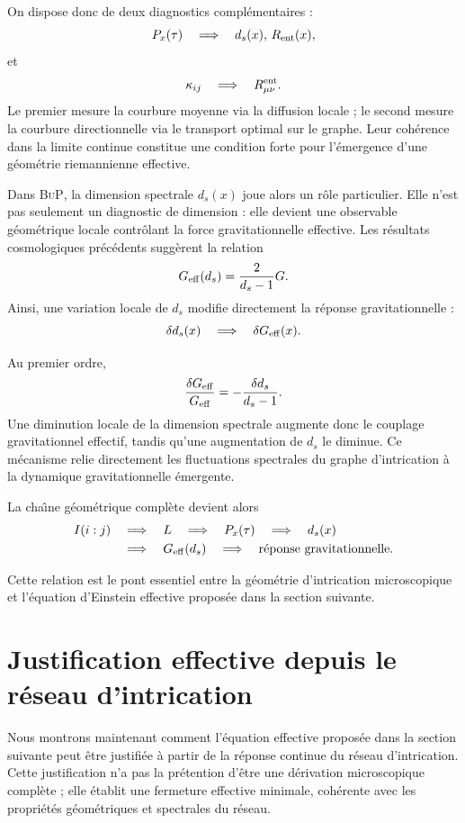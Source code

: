 \documentclass[11pt]{article}
\newcommand{\Geff}{G_{\rm eff}}
\newcommand{\BuP}{\textsc{BuP}}
\begin{document}
On dispose donc de deux diagnostics compl\'ementaires :
\[
P_x(\tau)
\quad\Longrightarrow\quad
d_s(x),\,R_{\rm ent}(x),
\]
et
\[
\kappa_{ij}
\quad\Longrightarrow\quad
R_{\mu\nu}^{\rm ent}.
\]
Le premier mesure la courbure moyenne via la diffusion locale ; le second mesure
la courbure directionnelle via le transport optimal sur le graphe. Leur coh\'erence
dans la limite continue constitue une condition forte pour l'\'emergence d'une
g\'eom\'etrie riemannienne effective.

Dans \BuP, la dimension spectrale $d_s(x)$ joue alors un r\^ole particulier. Elle
n'est pas seulement un diagnostic de dimension : elle devient une observable
g\'eom\'etrique locale contr\^olant la force gravitationnelle effective. Les r\'esultats
cosmologiques pr\'ec\'edents sugg\`erent la relation
\[
\Geff(d_s)
=
\frac{2}{d_s-1}G.
\]
Ainsi, une variation locale de $d_s$ modifie directement la r\'eponse gravitationnelle :
\[
\delta d_s(x)
\quad\Longrightarrow\quad
\delta\Geff(x).
\]

Au premier ordre,
\[
\frac{\delta\Geff}{\Geff}
=
-\frac{\delta d_s}{d_s-1}.
\]
Une diminution locale de la dimension spectrale augmente donc le couplage gravitationnel
effectif, tandis qu'une augmentation de $d_s$ le diminue. Ce m\'ecanisme relie
directement les fluctuations spectrales du graphe d'intrication \`a la dynamique
gravitationnelle \'emergente.

La cha\^{\i}ne g\'eom\'etrique compl\`ete devient alors
\[
\begin{aligned}
I(i:j)
&\quad\Longrightarrow\quad
L
\quad\Longrightarrow\quad
P_x(\tau)
\quad\Longrightarrow\quad
d_s(x)
\\
&\quad\Longrightarrow\quad
\Geff(d_s)
\quad\Longrightarrow\quad
\text{r\'eponse gravitationnelle}.
\end{aligned}
\]

Cette relation est le pont essentiel entre la g\'eom\'etrie d'intrication microscopique
et l'\'equation d'Einstein effective propos\'ee dans la section suivante.

\section{Justification effective depuis le r\'eseau d'intrication}
\label{sec:closure}

Nous montrons maintenant comment l'\'equation effective propos\'ee dans la section
suivante peut \^etre justifi\'ee \`a partir de la r\'eponse continue du r\'eseau
d'intrication. Cette justification n'a pas la pr\'etention d'\^etre une d\'erivation
microscopique compl\`ete ; elle \'etablit une fermeture effective minimale, coh\'erente
avec les propri\'et\'es g\'eom\'etriques et spectrales du r\'eseau.
\end{document}
